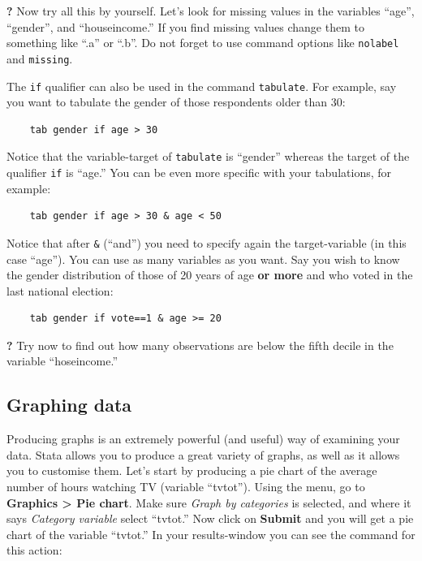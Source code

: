 \documentclass{article}
\newcommand{\forceindent}{\leavevmode{\parindent=2em\indent}}
\begin{document}
\forceindent \textbf{?} Now try all this by yourself. Let's look for missing values in the variables ``age'', ``gender'', and ``houseincome.'' If you find missing values change them to something like ``.a'' or ``.b''. Do not forget to use command options like \texttt{nolabel} and \texttt{missing}.

The \texttt{if} qualifier can also be used in the command \texttt{tabulate}. For example, say you want to tabulate the gender of those respondents older than 30:

\begin{lstlisting}
	tab gender if age > 30
\end{lstlisting}
 
 Notice that the variable-target of \texttt{tabulate} is ``gender'' whereas the target of the qualifier \texttt{if} is ``age.'' You can be even more specific with your tabulations, for example:
 
\begin{lstlisting}
	tab gender if age > 30 & age < 50
\end{lstlisting}

Notice that after \texttt{\&} (``and'') you need to specify again the target-variable (in this case ``age''). You can use as many variables as you want. Say you wish to know the gender distribution of those of 20 years of age \textbf{or more} and who voted in the last national election:

\begin{lstlisting}
	tab gender if vote==1 & age >= 20
\end{lstlisting}

\forceindent \textbf{?} Try now to find out how many observations are below the fifth decile in the variable ``hoseincome.''

\subsection*{Graphing data}

Producing graphs is an extremely powerful (and useful) way of examining your data. Stata allows you to produce a great variety of graphs, as well as it allows you to customise them. Let's start by producing a pie chart of the average number of hours watching TV (variable ``tvtot''). Using the menu, go to \textbf{Graphics > Pie chart}. Make sure \textit{Graph by categories} is selected, and where it says \textit{Category variable} select ``tvtot.'' Now click on \textbf{Submit} and you will get a pie chart of the variable ``tvtot.'' In your results-window you can see the command for this action:
\end{document}
